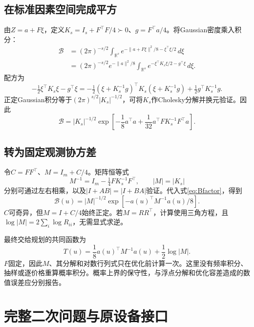 \documentclass[UTF8,11pt,a4paper,fontset=fandol]{ctexart}
\newcommand{\R}{\mathbb R}
\numberwithin{equation}{section}
\begin{document}
\subsection{在标准因素空间完成平方}
由$Z=a+F\xi$，定义$K_s=I_s+F^\top F/4\succ0$、$g=F^\top a/4$。将Gaussian密度乘入积分：
\begin{align}
\mathcal B
&=(2\pi)^{-s/2}\int_{\R^s}e^{-\|a+F\xi\|^2/8-\xi^\top\xi/2}\,d\xi\\
&=(2\pi)^{-s/2}e^{-\|a\|^2/8}
\int_{\R^s}e^{-\xi^\top K_s\xi/2-g^\top\xi}\,d\xi.
\end{align}
配方为
\begin{equation}
-\tfrac12\xi^\top K_s\xi-g^\top\xi
=-\tfrac12(\xi+K_s^{-1}g)^\top K_s(\xi+K_s^{-1}g)
+\tfrac12g^\top K_s^{-1}g.
\end{equation}
正定Gaussian积分等于$(2\pi)^{s/2}|K_s|^{-1/2}$，可将$K_s$作Cholesky分解并换元验证。因此
\begin{equation}
\mathcal B=|K_s|^{-1/2}
\exp\!\left[-\frac18a^\top a+\frac1{32}a^\top FK_s^{-1}F^\top a\right].
\label{eq:Bfactor}
\end{equation}

\subsection{转为固定观测协方差}
令$C=FF^\top$、$M=I_m+C/4$。矩阵恒等式
\begin{equation}
M^{-1}=I_m-\tfrac14FK_s^{-1}F^\top,
\qquad |M|=|K_s|
\end{equation}
分别可通过左右相乘，以及$|I+AB|=|I+BA|$验证。代入式\eqref{eq:Bfactor}，得到
\begin{equation}
\boxed{\mathcal B(u)=|M|^{-1/2}
\exp[-a(u)^\top M^{-1}a(u)/8].}
\label{eq:Bclosed}
\end{equation}
$C$可奇异，但$M=I+C/4$始终正定。若$M=RR^\top$，计算使用三角方程，且$\log|M|=2\sum_i\log R_{ii}$，无需显式求逆。

最终交给规划的共同函数为
\begin{equation}
\boxed{T(u)=\frac18a(u)^\top M^{-1}a(u)+\frac12\log|M|.}
\label{eq:Tclosed}
\end{equation}
$F$固定，因此$M$、其分解和对数行列式只在优化前计算一次。这里没有频率积分、抽样或逐价格重算概率积分。概率上界的保守性，与浮点分解和优化容差造成的数值误差应分别报告。

\section{完整二次问题与原设备接口}
\label{sec:optimization}
\end{document}
